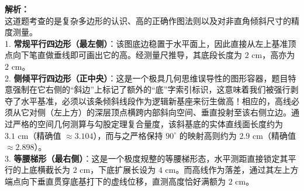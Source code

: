 \begin{center}
\end{center}

\vspace{0.8cm}

{\small\color{gray}
\textbf{解析：}\\
这道题考查的是复杂多边形的认识、高的正确作图法则以及对非直角倾斜尺寸的精度测量。\\
1. \textbf{常规平行四边形（最左侧）}：该图底边稳置于水平面上，因此直接从左上基准顶点向下笔直做垂线即可画出它的高。经测量尺推导，其底段长度为 $2\text{ cm}$，高亦为 $2\text{ cm}$。\\
2. \textbf{侧倾平行四边形（正中央）}：这是一个极具几何思维误导性的图形容器，题目特意强制在它右侧的“斜边”上标记了额外的“底”字索引标识，这意味着我们被强行剥夺了水平基准，必须以该条倾斜线段作为逻辑新基座来衍生做高！相应的，高线必须从它对侧（左上方）的深层顶点横跨内部斜向空间、垂直投射至该右侧立边。通过严格的空间几何测算与勾股定理复合量度，该斜基底的实体直线面长度约为 $3.1\text{ cm}$（精确值 $\approx 3.104$），而与之严格保持 $90^\circ$ 的映射高则约为 $2.9\text{ cm}$（精确值 $\approx 2.898$）。\\
3. \textbf{等腰梯形（最右侧）}：这是一个极度规整的等腰梯形态，水平测距直接锁定其平行的上底横截长为 $2\text{ cm}$，下底扩展长设为 $4\text{ cm}$。而高线作为落差，通过其左上方端点向下垂直贯穿底基打下的虚线位移，直测高度恰好满额为 $2\text{ cm}$。
}

\vspace{0.6cm}

